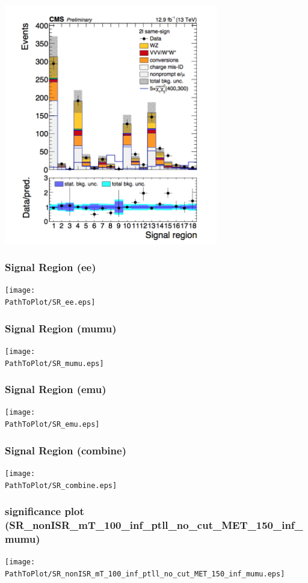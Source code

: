 \documentclass[mathserif,serif]{beamer}
\begin{document}
\begin{frame}
\includegraphics[width=0.7\textwidth]{data/photo/BG.png}
\end{frame}

\begin{frame}
\frametitle{Signal Region (ee)}
\texttt{[image: \\PathToPlot/SR\_ee.eps]}
\end{frame}

\begin{frame}
\frametitle{Signal Region (mumu)}
\texttt{[image: \\PathToPlot/SR\_mumu.eps]}
\end{frame}

\begin{frame}
\frametitle{Signal Region (emu)}
\texttt{[image: \\PathToPlot/SR\_emu.eps]}
\end{frame}

\begin{frame}
\frametitle{Signal Region (combine)}
\texttt{[image: \\PathToPlot/SR\_combine.eps]}
\end{frame}

\begin{frame}
\frametitle{significance plot (SR\_nonISR\_mT\_100\_inf\_ptll\_no\_cut\_MET\_150\_inf\_mumu)}
\texttt{[image: \\PathToPlot/SR\_nonISR\_mT\_100\_inf\_ptll\_no\_cut\_MET\_150\_inf\_mumu.eps]}
\end{frame}
\end{document}
